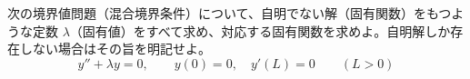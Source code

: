 
次の境界値問題（混合境界条件）について、自明でない解（固有関数）をもつような定数 $\lambda$（固有値）をすべて求め、対応する固有関数を求めよ。自明解しか存在しない場合はその旨を明記せよ。
\[
y'' + \lambda y = 0, \qquad y(0) = 0, \quad y'(L) = 0 \qquad (L > 0)
\]
